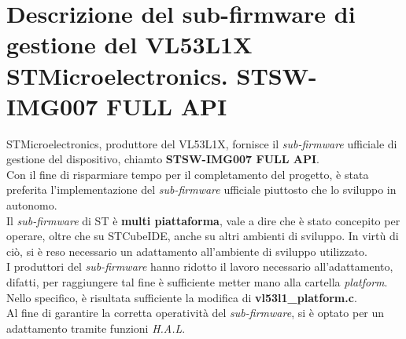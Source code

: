 
\section{Descrizione del sub-firmware di gestione del VL53L1X STMicroelectronics. STSW-IMG007 FULL API}
STMicroelectronics, produttore del VL53L1X, fornisce il \textit{sub-firmware} ufficiale di gestione del dispositivo, chiamto \textbf{STSW-IMG007 FULL API}.\\
Con il fine di risparmiare tempo per il completamento del progetto, è stata preferita l'implementazione del \textit{sub-firmware} ufficiale piuttosto che lo sviluppo in autonomo.\\
Il \textit{sub-firmware} di ST è \textbf{multi piattaforma}, vale a dire che è stato concepito per operare, oltre che su STCubeIDE, anche su altri ambienti di sviluppo. In virtù di ciò, si è reso 
necessario un adattamento all'ambiente di sviluppo utilizzato.\\
I produttori del \textit{sub-firmware} hanno ridotto il lavoro necessario all'adattamento, difatti, per raggiungere tal fine è sufficiente metter mano alla cartella \textit{platform}. Nello specifico, è risultata 
sufficiente la modifica di \textbf{vl53l1\_platform.c}.\\
Al fine di garantire la corretta operatività del \textit{sub-firmware}, si è optato per un adattamento tramite funzioni \textit{H.A.L}.

